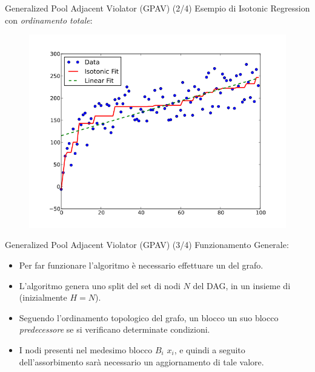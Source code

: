 \documentclass[9pt]{beamer}
\begin{document}
\begin{tframe}{Generalized Pool Adjacent Violator (GPAV) (2/4)}
Esempio di Isotonic Regression con \emph{ordinamento totale}:
\begin{figure}
\centering
\includegraphics[scale=0.3]{img/monotonic.png}
\end{figure}
\end{tframe}
\begin{tframe}{Generalized Pool Adjacent Violator (GPAV) (3/4)}
Funzionamento Generale:
\begin{itemize}
\item Per far funzionare l'algoritmo è necessario effettuare un  del grafo.
\item L’algoritmo genera uno split del set di nodi $N$ del DAG, in un insieme di  (inizialmente $H = N$).
\item Seguendo l'ordinamento topologico del grafo, un blocco  un suo blocco \emph{predecessore} se si verificano determinate condizioni.
\item I nodi presenti nel medesimo blocco $B_i$  $x_i$, e quindi a seguito dell'assorbimento sarà necessario un aggiornamento di tale valore.
\end{itemize}
\end{tframe}
\end{document}
